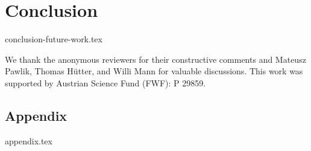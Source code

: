 \documentclass[sigconf, 10pt]{acmart}
\begin{document}
\section{Conclusion}
\label{sec:conclusion-future-work}
{conclusion-future-work.tex}

\begin{acks}
We thank the anonymous reviewers for their constructive comments and Mateusz Pawlik, Thomas H{\"u}tter, and Willi Mann for valuable discussions. This work was supported by Austrian Science Fund (FWF): P 29859.
\end{acks}




\begin{appendices}
\section{Appendix}
\label{sec:appendix}
{appendix.tex}
\clearpage %
\end{appendices}
\end{document}
